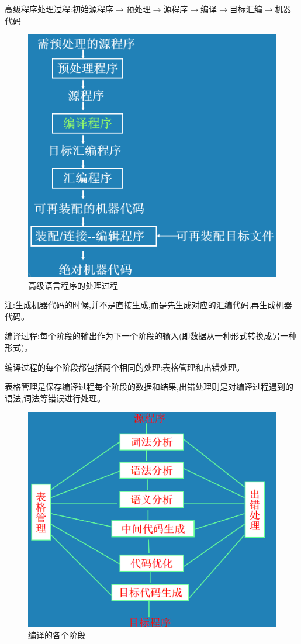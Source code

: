 高级程序处理过程:初始源程序$\to$预处理$\to$源程序$\to$编译$\to$目标汇编$\to$机器代码
\begin{figure}[H]
 \centering
 \includegraphics[scale = 0.3]{assets/CompilerConstructionPrinciples-part1_41d77.png}
 \caption{高级语言程序的处理过程}
\end{figure}

注:生成机器代码的时候,并不是直接生成,而是先生成对应的汇编代码,再生成机器代码。

编译过程:每个阶段的输出作为下一个阶段的输入(即数据从一种形式转换成另一种形式)。

编译过程的每个阶段都包括两个相同的处理:表格管理和出错处理。

表格管理是保存编译过程每个阶段的数据和结果,出错处理则是对编译过程遇到的语法,词法等错误进行处理。

\begin{figure}[H]
 \centering
 \includegraphics[scale = 0.3]{assets/CompilerConstructionPrinciples-part1_95806.png}
 \caption{编译的各个阶段}
\end{figure}

